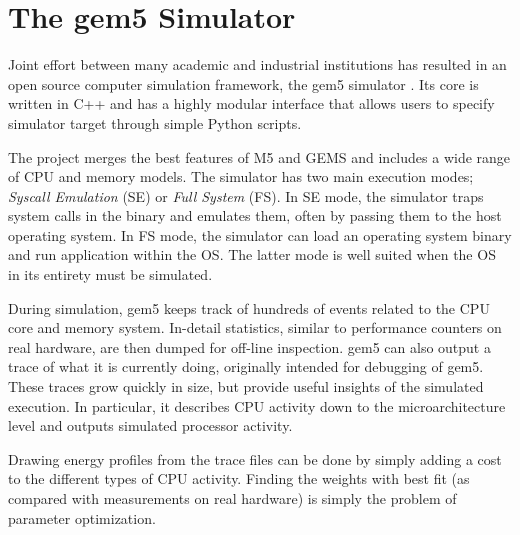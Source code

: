 \section{The gem5 Simulator}

Joint effort between many academic and industrial institutions has resulted in
an open source computer simulation framework, the gem5 simulator \cite{gem5}.
Its core is written in C++ and has a highly modular interface that allows users
to specify simulator target through simple Python scripts.

The project merges the best features of M5 \cite{M5} and GEMS \cite{GEMS} and
includes a wide range of CPU and memory models. The simulator has two main
execution modes; \textit{Syscall Emulation} (SE) or \textit{Full System} (FS).
In SE mode, the simulator traps system calls in the binary and emulates them,
often by passing them to the host operating system. In FS mode, the simulator
can load an operating system binary and run application within the OS. The
latter mode is well suited when the OS in its entirety must be simulated.


During simulation, gem5 keeps track of hundreds of events related to the CPU
core and memory system. In-detail statistics, similar to performance counters on
real hardware, are then dumped for off-line inspection. gem5 can also output a
trace of what it is currently doing, originally intended for debugging of gem5.
These traces grow quickly in size, but provide useful insights of the simulated
execution. In particular, it describes CPU activity down to the
microarchitecture level and outputs simulated processor activity.

Drawing energy profiles from the trace files can be done by simply adding a cost
to the different types of CPU activity. Finding the weights with best fit
(as compared with measurements on real hardware) is simply the problem of
parameter optimization.
